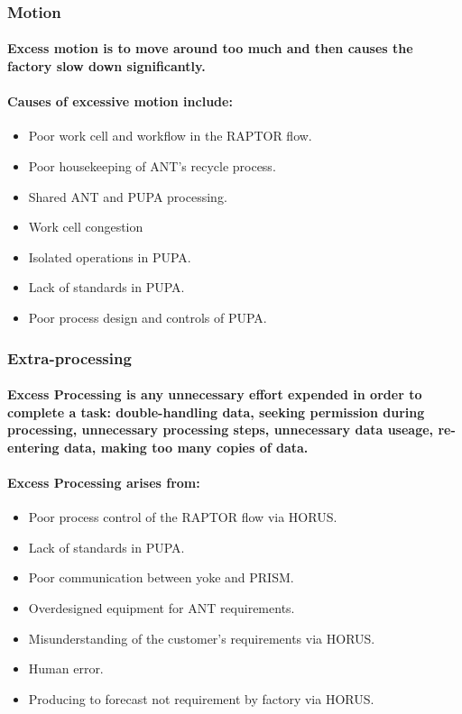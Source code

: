 \documentclass{acm_proc_article-sp}
\begin{document}
\subsubsection{Motion}
\paragraph{Excess motion is to move around too much and then causes the factory slow down significantly.}
\paragraph{Causes of excessive motion include:}
\begin{itemize}
\item Poor work cell and workflow in the RAPTOR flow.
\item Poor housekeeping of ANT's recycle process.
\item Shared ANT and PUPA processing.
\item Work cell congestion
\item Isolated operations in PUPA.
\item Lack of standards in PUPA.
\item Poor process design and controls of PUPA.
\end{itemize}
\subsubsection{Extra-processing}
\paragraph{Excess Processing is any unnecessary effort expended in order to complete a task: double-handling data, seeking permission during processing, unnecessary processing steps, unnecessary data useage, re-entering data, making too many copies of data.}
\paragraph{Excess Processing arises from:}
\begin{itemize}
\item Poor process control of the RAPTOR flow via HORUS.
\item Lack of standards in PUPA.
\item Poor communication between yoke and PRISM.
\item Overdesigned equipment for ANT requirements.
\item Misunderstanding of the customer's requirements via HORUS.
\item Human error.
\item Producing to forecast not requirement by factory via HORUS.
\end{itemize}
\end{document}
